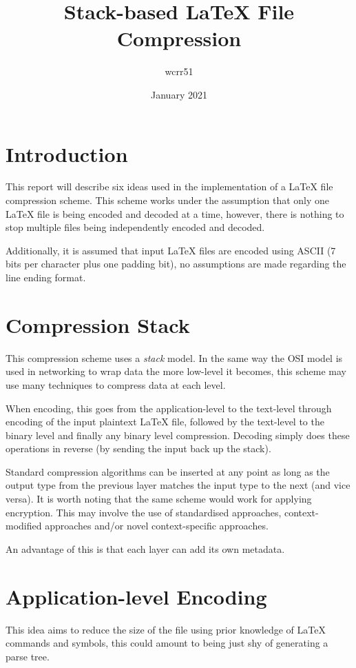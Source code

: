 \documentclass[11pt]{article}
\title{Stack-based \LaTeX{} File Compression}
\author{wcrr51}
\date{January 2021}
\begin{document}
    \maketitle

    \begin{multicols*}{2}

        \section{Introduction}\label{sec:introduction}
        This report will describe six ideas used in the implementation of a \LaTeX{} file compression scheme.
        This scheme works under the assumption that only one \LaTeX{} file is being encoded and decoded at a time, however, there is nothing to stop multiple files being independently encoded and decoded.

        Additionally, it is assumed that input \LaTeX{} files are encoded using ASCII (7 bits per character plus one padding bit), no assumptions are made regarding the line ending format.


        \section{Compression Stack}\label{sec:compression-stack}
        This compression scheme uses a \textit{stack} model.
        In the same way the OSI model is used in networking to wrap data the more low-level it becomes, this scheme may use many techniques to compress data at each level.

        When encoding, this goes from the application-level to the text-level through encoding of the input plaintext \LaTeX{} file, followed by the text-level to the binary level and finally any binary level compression.
        Decoding simply does these operations in reverse (by sending the input back up the stack).

        Standard compression algorithms can be inserted at any point as long as the output type from the previous layer matches the input type to the next (and vice versa).
        It is worth noting that the same scheme would work for applying encryption.
        This may involve the use of standardised approaches, context-modified approaches and/or novel context-specific approaches.

        An advantage of this is that each layer can add its own metadata.


        \section{Application-level Encoding}\label{sec:application-level-encoding}
        This idea aims to reduce the size of the file using prior knowledge of \LaTeX{} commands and symbols, this could amount to being just shy of generating a parse tree.


\end{multicols*}
\end{document}
